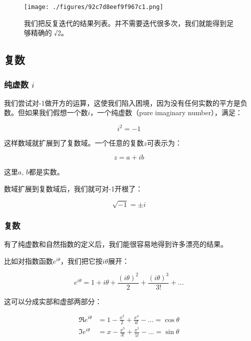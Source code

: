 \begin{figure}[ht]
\centering
\texttt{[image: ./figures/92c7d8eef9f967c1.png]}
\caption{ 我们把反复迭代的结果列表。并不需要迭代很多次，我们就能得到⾜够精确的 √2。} \label{fig_QMPre6_2}
\end{figure}

\subsection{复数}

\subsubsection{纯虚数 $i$}


我们尝试对-1做开方的运算，这使我们陷入困境，因为没有任何实数的平方是负数。但如果我们假想一个数$i$，一个纯虚数（pure imaginary number），满足：

\begin{equation}
i^2 = -1~
\end{equation}

这样数域就扩展到了复数域。一个任意的复数$z$可表示为：

\begin{equation}
z = a + ib~
\end{equation}

这里$a$, $b$都是实数。

数域扩展到复数域后，我们就可对-1开根了：

\begin{equation}
\sqrt{-1} = \pm i~
\end{equation}

\subsubsection{复数}

有了纯虚数和自然指数的定义后，我们能很容易地得到许多漂亮的结果。

比如对指数函数$e^{i \theta}$，我们把它按$i \theta$展开：

\begin{equation}
e^{i \theta} = 1 + i \theta + \frac{(i \theta)^2}{2}+ \frac{(i \theta)^3}{3!} + ...~
\end{equation}

这可以分成实部和虚部两部分：

\begin{align}
\Re e^{i \theta} & =  1 - \frac{x^2}{2} + \frac{x^4}{4!} - ... = \cos \theta   \\
\Im e^{i \theta} & =  x - \frac{x^3}{3!} + \frac{x^5}{5!} - ... = \sin \theta ~
\end{align}

